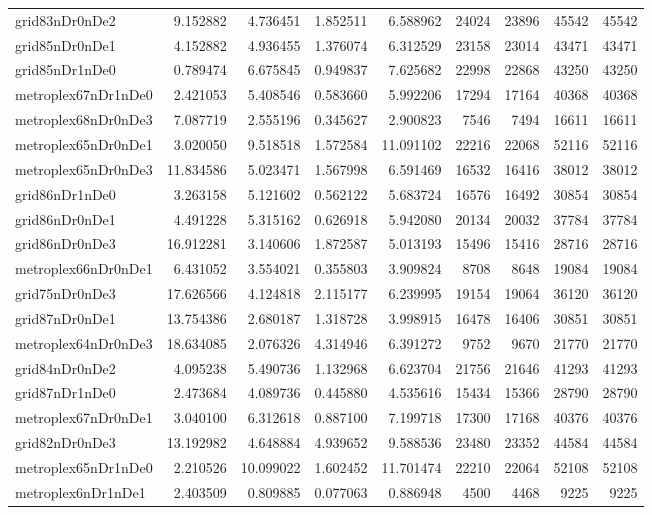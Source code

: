 \begin{longtable}{|l|r|r|r|r|r|r|r|r|}
grid83nDr0nDe2 & 9.152882 & 4.736451 & 1.852511 & 6.588962 & 24024 & 23896 & 45542 & 45542 \\
grid85nDr0nDe1 & 4.152882 & 4.936455 & 1.376074 & 6.312529 & 23158 & 23014 & 43471 & 43471 \\
grid85nDr1nDe0 & 0.789474 & 6.675845 & 0.949837 & 7.625682 & 22998 & 22868 & 43250 & 43250 \\
metroplex67nDr1nDe0 & 2.421053 & 5.408546 & 0.583660 & 5.992206 & 17294 & 17164 & 40368 & 40368 \\
metroplex68nDr0nDe3 & 7.087719 & 2.555196 & 0.345627 & 2.900823 & 7546 & 7494 & 16611 & 16611 \\
metroplex65nDr0nDe1 & 3.020050 & 9.518518 & 1.572584 & 11.091102 & 22216 & 22068 & 52116 & 52116 \\
metroplex65nDr0nDe3 & 11.834586 & 5.023471 & 1.567998 & 6.591469 & 16532 & 16416 & 38012 & 38012 \\
grid86nDr1nDe0 & 3.263158 & 5.121602 & 0.562122 & 5.683724 & 16576 & 16492 & 30854 & 30854 \\
grid86nDr0nDe1 & 4.491228 & 5.315162 & 0.626918 & 5.942080 & 20134 & 20032 & 37784 & 37784 \\
grid86nDr0nDe3 & 16.912281 & 3.140606 & 1.872587 & 5.013193 & 15496 & 15416 & 28716 & 28716 \\
metroplex66nDr0nDe1 & 6.431052 & 3.554021 & 0.355803 & 3.909824 & 8708 & 8648 & 19084 & 19084 \\
grid75nDr0nDe3 & 17.626566 & 4.124818 & 2.115177 & 6.239995 & 19154 & 19064 & 36120 & 36120 \\
grid87nDr0nDe1 & 13.754386 & 2.680187 & 1.318728 & 3.998915 & 16478 & 16406 & 30851 & 30851 \\
metroplex64nDr0nDe3 & 18.634085 & 2.076326 & 4.314946 & 6.391272 & 9752 & 9670 & 21770 & 21770 \\
grid84nDr0nDe2 & 4.095238 & 5.490736 & 1.132968 & 6.623704 & 21756 & 21646 & 41293 & 41293 \\
grid87nDr1nDe0 & 2.473684 & 4.089736 & 0.445880 & 4.535616 & 15434 & 15366 & 28790 & 28790 \\
metroplex67nDr0nDe1 & 3.040100 & 6.312618 & 0.887100 & 7.199718 & 17300 & 17168 & 40376 & 40376 \\
grid82nDr0nDe3 & 13.192982 & 4.648884 & 4.939652 & 9.588536 & 23480 & 23352 & 44584 & 44584 \\
metroplex65nDr1nDe0 & 2.210526 & 10.099022 & 1.602452 & 11.701474 & 22210 & 22064 & 52108 & 52108 \\
metroplex6nDr1nDe1 & 2.403509 & 0.809885 & 0.077063 & 0.886948 & 4500 & 4468 & 9225 & 9225 \\

\end{longtable}
